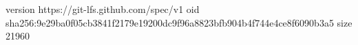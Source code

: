 version https://git-lfs.github.com/spec/v1
oid sha256:9e29ba0f05cb3841f2179e19200dc9f96a8823bfb904b4f744e4ce8f6090b3a5
size 21960
